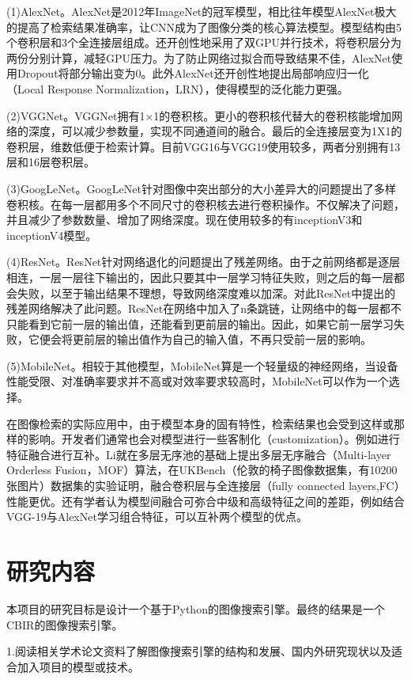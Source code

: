 \documentclass[bachelor_p]{hdu-thesis}
\begin{document}
(1)AlexNet。AlexNet是2012年ImageNet的冠军模型，相比往年模型AlexNet极大的提高了检索结果准确率，让CNN成为了图像分类的核心算法模型。模型结构由5个卷积层和3个全连接层组成。还开创性地采用了双GPU并行技术，将卷积层分为两份分别计算，减轻GPU压力。为了防止网络过拟合而导致结果不佳，AlexNet使用Dropout将部分输出变为0。此外AlexNet还开创性地提出局部响应归一化（Local Response Normalization，LRN），使得模型的泛化能力更强。

(2)VGGNet。VGGNet拥有1×1的卷积核。更小的卷积核代替大的卷积核能增加网络的深度，可以减少参数量，实现不同通道间的融合。最后的全连接层变为1X1的卷积层，维数低便于检索计算。目前VGG16与VGG19使用较多，两者分别拥有13层和16层卷积层。

(3)GoogLeNet。GoogLeNet针对图像中突出部分的大小差异大的问题提出了多样卷积核。在每一层都用多个不同尺寸的卷积核去进行卷积操作。不仅解决了问题，并且减少了参数数量、增加了网络深度。现在使用较多的有inceptionV3和inceptionV4模型。

(4)ResNet。ResNet针对网络退化的问题提出了残差网络。由于之前网络都是逐层相连，一层一层往下输出的，因此只要其中一层学习特征失败，则之后的每一层都会失败，以至于输出结果不理想，导致网络深度难以加深。对此ResNet中提出的残差网络解决了此问题。ResNet在网络中加入了n条跳链，让网络中的每一层都不只能看到它前一层的输出值，还能看到更前层的输出。因此，如果它前一层学习失败，它便会将更前层的输出值作为自己的输入值，不再只受前一层的影响。

(5)MobileNet。相较于其他模型，MobileNet算是一个轻量级的神经网络，当设备性能受限、对准确率要求并不高或对效率要求较高时，MobileNet可以作为一个选择。

在图像检索的实际应用中，由于模型本身的固有特性，检索结果也会受到这样或那样的影响。开发者们通常也会对模型进行一些客制化（customization）。例如进行特征融合进行互补。Li\citep{Li}就在多层无序池的基础上提出多层无序融合（Multi-layer Orderless Fusion，MOF）算法，在UKBench（伦敦的椅子图像数据集，有10200张图片）数据集的实验证明，融合卷积层与全连接层（fully connected layers,FC）性能更优。还有学者认为模型间融合可弥合中级和高级特征之间的差距，例如结合VGG-19与AlexNet学习组合特征，可以互补两个模型的优点。

\section{研究内容}

本项目的研究目标是设计一个基于Python的图像搜索引擎。最终的结果是一个CBIR的图像搜索引擎。

1.阅读相关学术论文资料了解图像搜索引擎的结构和发展、国内外研究现状以及适合加入项目的模型或技术。
\end{document}
